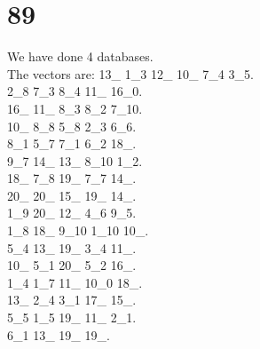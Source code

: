\chapter{89}
\indent We have done 4 databases.\\
The vectors are:
13\_ 1\_3 12\_ 10\_ 7\_4 3\_5.\\2\_8 7\_3 8\_4 11\_ 16\_0.\\16\_ 11\_ 8\_3 8\_2 7\_10.\\10\_ 8\_8 5\_8 2\_3 6\_6.\\8\_1 5\_7 7\_1 6\_2 18\_.\\9\_7 14\_ 13\_ 8\_10 1\_2.\\18\_ 7\_8 19\_ 7\_7 14\_.\\20\_ 20\_ 15\_ 19\_ 14\_.\\1\_9 20\_ 12\_ 4\_6 9\_5.\\1\_8 18\_ 9\_10 1\_10 10\_.\\5\_4 13\_ 19\_ 3\_4 11\_.\\10\_ 5\_1 20\_ 5\_2 16\_.\\1\_4 1\_7 11\_ 10\_0 18\_.\\13\_ 2\_4 3\_1 17\_ 15\_.\\5\_5 1\_5 19\_ 11\_ 2\_1.\\6\_1 13\_ 19\_ 19\_.\\